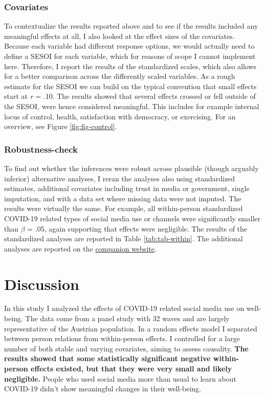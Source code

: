 \documentclass[
  man,mask]{apa7}
\begin{document}
\hypertarget{covariates}{%
\subsubsection{Covariates}\label{covariates}}

To contextualize the results reported above and to see if the results included any meaningful effects at all, I also looked at the effect sizes of the covariates.
Because each variable had different response options, we would actually need to define a SESOI for each variable, which for reasons of scope I cannot implement here.
Therefore, I report the results of the standardized scales,
which also allows for a better comparison across the differently scaled variables.
As a rough estimate for the SESOI we can build on the typical convention that small effects start at \emph{r} = \textbar.10\textbar.
The results showed that several effects crossed or fell outside of the SESOI, were hence considered meaningful.
This includes for example internal locus of control, health, satisfaction with democracy, or exercising.
For an overview, see Figure \ref{fig:fig-control}.

\hypertarget{robustness-check}{%
\subsubsection{Robustness-check}\label{robustness-check}}

To find out whether the inferences were robust across plausible (though arguably inferior) alternative analyses, I reran the analyses also using standardized estimates, additional covariates including trust in media or government, single imputation, and with a data set where missing data were not imputed.
The results were virtually the same.
For example, all within-person standardized COVID-19 related types of social media use or channels were significantly smaller than \(\beta\) = \textbar.05\textbar, again supporting that effects were negligible.
The results of the standardized analyses are reported in Table \ref{tab:tab-within}.
The additional analyses are reported on the \href{https://XMtRA.github.io/Austrian_Corona_Panel_Project/analyses_additional.html}{companion website}.

\hypertarget{discussion}{%
\section{Discussion}\label{discussion}}

In this study I analyzed the effects of COVID-19 related social media use on well-being.
The data come from a panel study with 32 waves and are largely representative of the Austrian population.
In a random effects model I separated between person relations from within-person effects.
I controlled for a large number of both stable and varying covariates, aiming to assess causality.
\textbf{The results showed that some statistically significant negative within-person effects existed, but that they were very small and likely negligible.}
People who used social media more than usual to learn about COVID-19 didn't show meaningful changes in their well-being.
\end{document}
